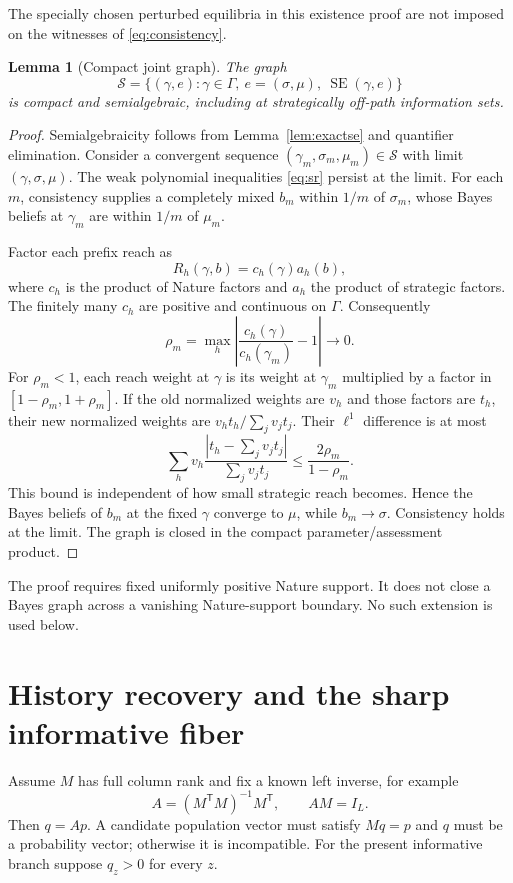 \documentclass[11pt,a4paper]{article}
\numberwithin{equation}{section}
\newtheorem{lemma}[theorem]{Lemma}
\theoremstyle{definition}
\DeclareMathOperator{\SE}{SE}
\begin{document}
The specially chosen perturbed equilibria in this existence proof
are not imposed on the witnesses of \eqref{eq:consistency}.

\begin{lemma}[Compact joint graph]\label{lem:compact}
The graph
\[
 \mathcal S=\{(\gamma,e):\gamma\in\Gamma,\
                   e=(\sigma,\mu),\ \SE(\gamma,e)\}
\]
is compact and semialgebraic, including at strategically off-path
information sets.
\end{lemma}
\begin{proof}
Semialgebraicity follows from Lemma~\ref{lem:exactse} and quantifier
elimination. Consider a convergent sequence
\((\gamma_m,\sigma_m,\mu_m)\in\mathcal S\) with limit
\((\gamma,\sigma,\mu)\). The weak polynomial inequalities
\eqref{eq:sr} persist at the limit.
For each \(m\), consistency supplies a completely mixed \(b_m\)
within \(1/m\) of \(\sigma_m\), whose Bayes beliefs at \(\gamma_m\)
are within \(1/m\) of \(\mu_m\).

Factor each prefix reach as
\[
 R_h(\gamma,b)=c_h(\gamma)a_h(b),
\]
where \(c_h\) is the product of Nature factors and \(a_h\) the product
of strategic factors. The finitely many \(c_h\) are positive and
continuous on \(\Gamma\). Consequently
\[
 \rho_m=\max_h\left|
     \frac{c_h(\gamma)}{c_h(\gamma_m)}-1\right|\longrightarrow0 .
\]
For \(\rho_m<1\), each reach weight at \(\gamma\) is its weight at
\(\gamma_m\) multiplied by a factor in
\([1-\rho_m,1+\rho_m]\). If the old normalized weights are \(v_h\)
and those factors are \(t_h\), their new normalized weights are
\(v_ht_h/\sum_jv_jt_j\). Their \(\ell^1\) difference is at most
\[
 \sum_h v_h
   \frac{|t_h-\sum_jv_jt_j|}{\sum_jv_jt_j}
       \le \frac{2\rho_m}{1-\rho_m}.
\]
This bound is independent of how small strategic reach becomes.
Hence the Bayes beliefs of \(b_m\) at the fixed \(\gamma\) converge
to \(\mu\), while \(b_m\to\sigma\). Consistency holds at the limit.
The graph is closed in the compact parameter/assessment product.
\end{proof}

The proof requires fixed uniformly positive Nature support.
It does not close a Bayes graph across a vanishing Nature-support
boundary. No such extension is used below.

\section{History recovery and the sharp informative fiber}\label{sec:fiber}
Assume \(M\) has full column rank and fix a known left inverse, for example
\begin{equation}\label{eq:leftinverse}
 A=(M^{\mathsf T}M)^{-1}M^{\mathsf T},\qquad AM=I_L.
\end{equation}
Then \(q=Ap\). A candidate population vector must satisfy \(Mq=p\)
and \(q\) must be a probability vector; otherwise it is incompatible.
For the present informative branch suppose \(q_z>0\) for every \(z\).
\end{document}
